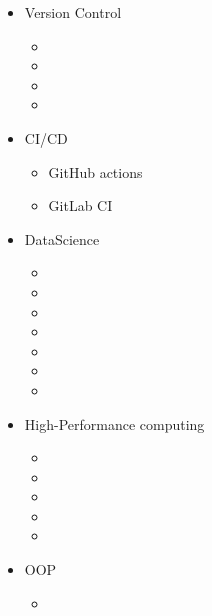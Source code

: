 \documentclass{CurriculumVitae}[10pt, draft, condensed]
\begin{document}
\begin{multicols}{4}
  \begin{itemize}[topsep=0pt]
    \setlength{\itemsep}{-0.3em}
  \item {\footnotesize Version Control}
    \begin{itemize}[topsep=0pt, partopsep=0pt]
      \setlength{\itemsep}{-0.3em}
    \item {}
    \item {}
    \item {}
    \item {}
    \end{itemize}
  \item {\footnotesize CI/CD}
    \begin{itemize}[topsep=0pt, partopsep=0pt]
      \setlength{\itemsep}{-0.3em}
    \item {\footnotesize GitHub actions}
    \item {\footnotesize GitLab CI}
    \end{itemize}
  \item {\footnotesize DataScience}
    \begin{itemize}[topsep=0pt, partopsep=0pt]
      \setlength{\itemsep}{-0.3em}
    \item {}
    \item {}
    \item {}
    \item {}
    \item {}
    \item {}
    \item {}
    \end{itemize}
  \item {\footnotesize High-Performance computing}
    \begin{itemize}[topsep=0pt, partopsep=0pt]
      \setlength{\itemsep}{-0.3em}
    \item {}
    \item {}
    \item {}
    \item {}
    \item {}
    \end{itemize}
  \item {\footnotesize OOP}
    \begin{itemize}[topsep=0pt, partopsep=0pt]
      \setlength{\itemsep}{-0.3em}
    \item {}

\end{itemize}
\end{itemize}
\end{multicols}
\end{document}
